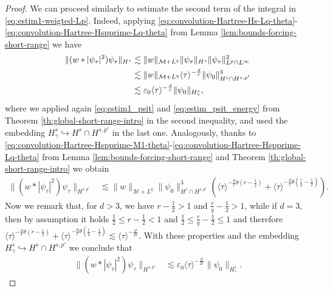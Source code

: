 \documentclass[12pt]{article}
\theoremstyle{plain}
\newcommand{\meas}{\mathcal{M}}
\begin{document}
\begin{proof}
We can proceed similarly to estimate the second term of the integral in \eqref{eq:estim1-weigted-Lp}. Indeed, applying \eqref{eq:convolution-Hartree-Hs-Lq-theta}-\eqref{eq:convolution-Hartree-Hspprime-Lq-theta} from Lemma \ref{lem:bounds-forcing-short-range} we have 
\begin{align}
\|(w * |\psi_\tau|^2)\psi_\tau\|_{H^s} &\lesssim  \|w\|_{\meas+L^{q}} \|\psi_\tau\|_{H^s} \|\psi_\tau\|_{L^p\cap L^\infty}^2 \nonumber\\
&\lesssim \|w\|_{\meas+L^{q}} \langle \tau \rangle^{-\frac{d}{r}} \|\psi_0 \|_{H^s\cap H^{s,p'}}^3\notag\\
&\lesssim \varepsilon_0\langle \tau \rangle^{-\frac{d}{r}} \|\psi_0 \|_{H^s_\gamma} \label{eq:bound Hs-G gamma,s},
\end{align}
where we applied again \eqref{eq:estim1_psit} and \eqref{eq:estim_psit_energy} from Theorem \ref{th:global-short-range-intro} in the second inequality, and used the embedding $H^s_\gamma \hookrightarrow H^s \cap H^{s, p'}$ in the last one. Analogously, thanks to \eqref{eq:convolution-Hartree-Hspprime-M1-theta}-\eqref{eq:convolution-Hartree-Hspprime-Lq-theta} from Lemma \ref{lem:bounds-forcing-short-range} and Theorem \ref{th:global-short-range-intro} we obtain 
\begin{align*}
    \|(w * |\psi_\tau|^2)\psi_\tau\|_{H^{s, p'}} &\lesssim  \|w\|_{\meas+L^{q}} \|\psi_0 \|_{H^s\cap H^{s,p'}}^3 (\langle \tau \rangle^{-\frac{d}{r} \theta(r-\frac{1}{2})}  + \langle \tau \rangle^{-\frac{d}{r} \theta(\frac{r}{q}- \frac12)} ).
\end{align*}
Now we remark that, for $d>3$, we have $r-\frac12>1$ and $\frac{r}{q}-\frac12> 1$, while if $d=3$, then by assumption it holds $\frac12\le r-\frac12<1$ and $\frac12\le \frac{r}{q}-\frac12\leq 1$ and therefore $\langle \tau \rangle^{-\frac{d}{r} \theta(r-\frac{1}{2})}  +\langle \tau \rangle^{-\frac{d}{r} \theta(\frac{r}{q}- \frac12)} \lesssim  \langle \tau \rangle^{-\frac{d}{2r}} $. With these properties and the embedding $H^s_\gamma \hookrightarrow H^s \cap H^{s, p'}$ we conclude that 
\begin{align}
     \|(w * |\psi_\tau|^2)\psi_\tau\|_{H^{s, p'}} 
    & \lesssim \varepsilon_0 \langle \tau \rangle^{-\frac{d}{2r}} \|\psi_0 \|_{H^s_\gamma} .\label{eq:bound Hsprime-G gamma,s}
\end{align}



\end{proof}
\end{document}
